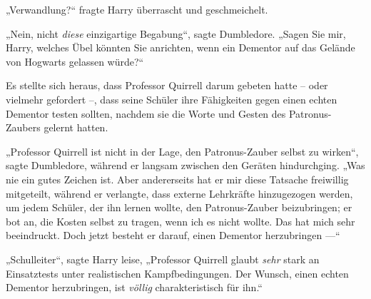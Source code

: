 „Verwandlung?“ fragte Harry überrascht und geschmeichelt.

„Nein, nicht \emph{diese} einzigartige Begabung“, sagte Dumbledore.
„Sagen Sie mir, Harry, welches Übel könnten Sie anrichten, wenn ein Dementor auf das Gelände von Hogwarts gelassen würde?“

\later

Es stellte sich heraus, dass Professor Quirrell darum gebeten hatte – oder vielmehr gefordert –, dass seine Schüler ihre Fähigkeiten gegen einen echten Dementor testen sollten, nachdem sie die Worte und Gesten des Patronus-Zaubers gelernt hatten.

„Professor Quirrell ist nicht in der Lage, den Patronus-Zauber selbst zu wirken“, sagte Dumbledore, während er langsam zwischen den Geräten hindurchging.
„Was nie ein gutes Zeichen ist. Aber andererseits hat er mir diese Tatsache freiwillig mitgeteilt, während er verlangte, dass externe Lehrkräfte hinzugezogen werden, um jedem Schüler, der ihn lernen wollte, den Patronus-Zauber beizubringen; er bot an, die Kosten selbst zu tragen, wenn ich es nicht wollte. Das hat mich sehr beeindruckt. Doch jetzt besteht er darauf, einen Dementor herzubringen —“

„Schulleiter“, sagte Harry leise,
„Professor Quirrell glaubt \emph{sehr} stark an Einsatztests unter realistischen Kampfbedingungen. Der Wunsch, einen echten Dementor herzubringen, ist \emph{völlig} charakteristisch für ihn.“

